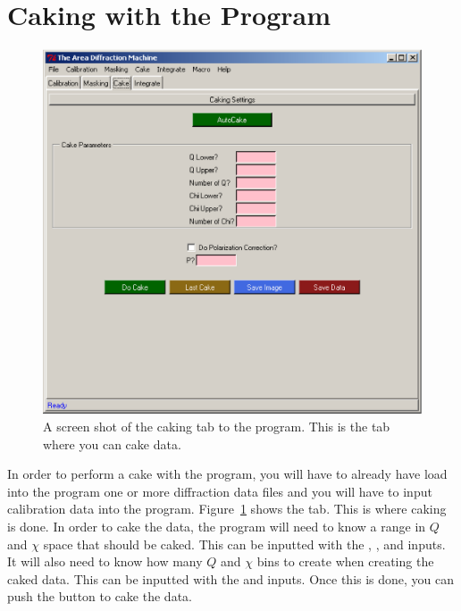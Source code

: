 \section{Caking with the Program}


\begin{figure}
\centering
\includegraphics[scale=.75]{figures/caking_page.eps}
\caption{A screen shot of the caking tab to the program.
    This is the tab where you can cake data.} 
\label{caking_page}
\end{figure}


In order to perform a cake with the program, you will have
to already have load into the program one or more
diffraction data files and you will have to input
calibration data into the program. Figure~\ref{caking_page}
shows the  tab. This is where caking is done. 
In order to cake the data, the program will need to know a range
in $Q$ and $\chi$ space that should be caked. 
This can be inputted with the , 
, and  inputs.
It will also need to know how many $Q$ and $\chi$ bins to 
create when creating the caked data. This can be inputted
with the  and  inputs.
Once this is done, you can push the 
 button to cake the data. 

